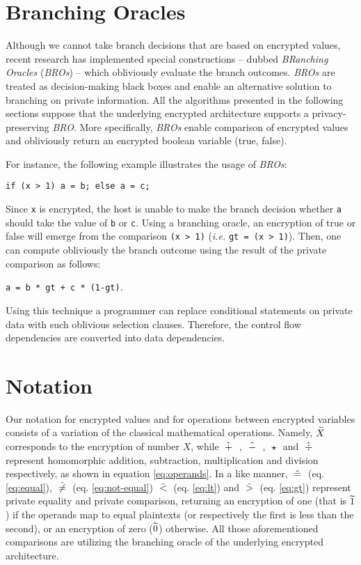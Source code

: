 \section{Branching Oracles}\label{s:bros}
Although we cannot take branch decisions that are based on encrypted values, recent research \cite{mazonka2016cryptoleq} has implemented special constructions -- dubbed \emph{BRanching} \emph{Oracles} (\emph{BROs}) -- which obliviously evaluate the branch outcomes.
\emph{BROs} are treated as decision-making black boxes and enable an alternative solution to branching on private information.
All the algorithms presented in the following sections suppose that the underlying encrypted architecture supports a privacy\hyp preserving \emph{BRO}.
More specifically, \emph{BROs} enable comparison of encrypted values and obliviously return an encrypted boolean variable (true, false).

For instance, the following example illustrates the usage of \emph{BROs}:

\texttt{if (x > 1) a = b; else a = c; }

Since \texttt{x} is encrypted, the host is unable to make the branch decision whether \texttt{a} should take the value of \texttt{b} or \texttt{c}.
Using a branching oracle, an encryption of true or false will emerge from the comparison \texttt{(x > 1)} (\textit{i.e.} \texttt{gt = (x > 1)}).
Then, one can compute obliviously the branch outcome using the result of the private comparison as follows:

\texttt{a = b * gt + c * (1-gt)}.

Using this technique a programmer can replace conditional statements on private data with such oblivious selection clauses.
Therefore, the control flow dependencies are converted into data dependencies.



\section{Notation}\label{s:notation}
Our notation for encrypted values and for operations between encrypted variables consists of a variation of the classical mathematical operations.
Namely, $\widetilde{X}$ corresponds to the encryption of number $X$, while $\;\hat{+}\;$ , $\;\hat{-}\;$ , $\;\star\;$ and $\;\hat{\div}\;$ represent homomorphic addition, subtraction, multiplication and division respectively, as shown in equation \ref{eq:operands}.
In a like manner, $\;\hat{=}\;$ (eq. \ref{eq:equal}), $\;\hat{\neq}\;$ (eq. \ref{eq:not-equal}) $\;\hat{<}\;$ (eq. \ref{eq:lt}) and $\;\hat{>}\;$ (eq. \ref{eq:gt}) represent private equality and private comparison, returning an encryption of one (that is $\widetilde{1}$) if the operands map to equal plaintexts (or respectively the first is less than the second), or an encryption of zero ($\widetilde{0}$) otherwise.
All those aforementioned comparisons are utilizing the branching oracle of the underlying encrypted architecture.

